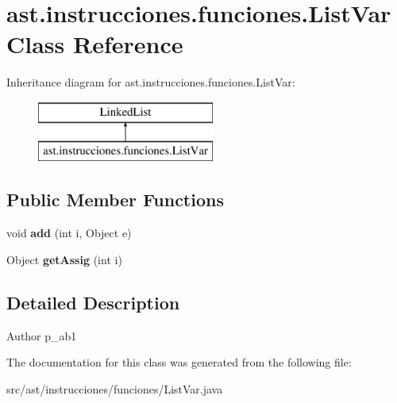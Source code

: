 \hypertarget{classast_1_1instrucciones_1_1funciones_1_1_list_var}{}\section{ast.\+instrucciones.\+funciones.\+List\+Var Class Reference}
\label{classast_1_1instrucciones_1_1funciones_1_1_list_var}
Inheritance diagram for ast.\+instrucciones.\+funciones.\+List\+Var\+:\begin{figure}[H]
\begin{center}
\leavevmode
\includegraphics[height=2.000000cm]{classast_1_1instrucciones_1_1funciones_1_1_list_var}
\end{center}
\end{figure}
\subsection*{Public Member Functions}
\begin{DoxyCompactItemize}
\item 
\mbox{\label{classast_1_1instrucciones_1_1funciones_1_1_list_var_ab0e6a2e87a44a4cba29be32fb1b7de05}} 
void {\bfseries add} (int i, Object e)
\item 
\mbox{\label{classast_1_1instrucciones_1_1funciones_1_1_list_var_afc6bf4368bef6a8101497544f6f54446}} 
Object {\bfseries get\+Assig} (int i)
\end{DoxyCompactItemize}


\subsection{Detailed Description}
\begin{DoxyAuthor}{Author}
p\+\_\+ab1 
\end{DoxyAuthor}


The documentation for this class was generated from the following file\+:\begin{DoxyCompactItemize}
\item 
src/ast/instrucciones/funciones/List\+Var.\+java\end{DoxyCompactItemize}

